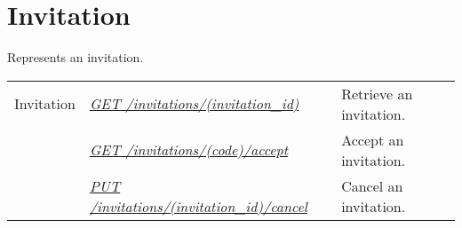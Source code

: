 \documentclass[letterpaper,10pt,english]{sphinxmanual}
\begin{document}
\section{Invitation}
\label{\detokenize{resources/invitation::doc}}\label{\detokenize{resources/invitation:invitation}}\label{\detokenize{resources/invitation:id1}}
Represents an invitation.

\noindent\begin{tabulary}{\linewidth}{|L|L|L|}
\hline
{}\relax &\relax &\relax \\
\hline
Invitation
&
{\hyperref[\detokenize{resources/invitation:get--invitations-(invitation_id)}]{\emph{GET /invitations/(invitation\_id)}}}
&
Retrieve an invitation.
\\
\hline&
{\hyperref[\detokenize{resources/invitation:get--invitations-(code)-accept}]{\emph{GET /invitations/(code)/accept}}}
&
Accept an invitation.
\\
\hline&
{\hyperref[\detokenize{resources/invitation:put--invitations-(invitation_id)-cancel}]{\emph{PUT /invitations/(invitation\_id)/cancel}}}
&
Cancel an invitation.
\\
\hline\end{tabulary}


\begin{DUlineblock}{0em}
\item[] 
\end{DUlineblock}
\end{document}
